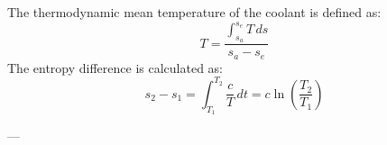 The thermodynamic mean temperature of the coolant is defined as:  
\[
T = \frac{\int_{s_a}^{s_e} T \, ds}{s_a - s_e}
\]  
The entropy difference is calculated as:  
\[
s_2 - s_1 = \int_{T_1}^{T_2} \frac{c}{T} \, dt = c \ln \left( \frac{T_2}{T_1} \right)
\]  

---